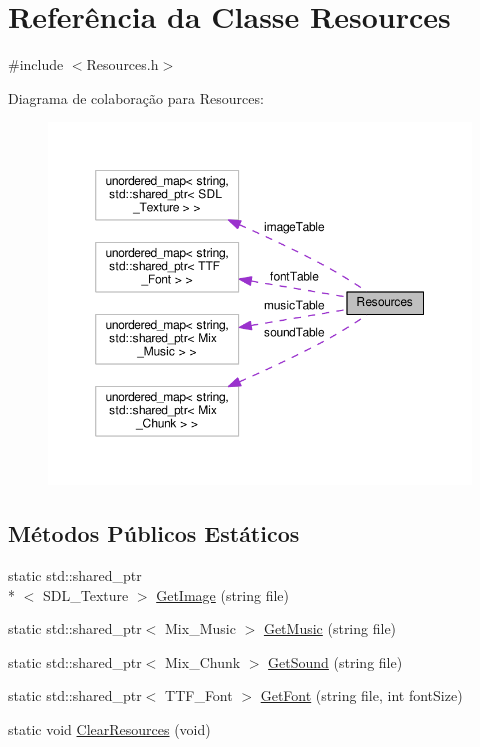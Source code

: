 \hypertarget{classResources}{\section{Referência da Classe Resources}
\label{classResources}
}


{\ttfamily \#include $<$Resources.\+h$>$}



Diagrama de colaboração para Resources\+:
\nopagebreak
\begin{figure}[H]
\begin{center}
\leavevmode
\includegraphics[width=350pt]{classResources__coll__graph}
\end{center}
\end{figure}
\subsection*{Métodos Públicos Estáticos}
\begin{DoxyCompactItemize}
\item 
static std\+::shared\+\_\+ptr\\*
$<$ S\+D\+L\+\_\+\+Texture $>$ \hyperlink{classResources_a557aa346c974a8bce80017dbabd653d9}{Get\+Image} (string file)
\item 
static std\+::shared\+\_\+ptr$<$ Mix\+\_\+\+Music $>$ \hyperlink{classResources_a9ed99125bc4d75514e1175fab6f9badf}{Get\+Music} (string file)
\item 
static std\+::shared\+\_\+ptr$<$ Mix\+\_\+\+Chunk $>$ \hyperlink{classResources_ae6e4e0202dec020da8f6654f685e8b98}{Get\+Sound} (string file)
\item 
static std\+::shared\+\_\+ptr$<$ T\+T\+F\+\_\+\+Font $>$ \hyperlink{classResources_a661a92ea82fb73e31092059d6fc383c3}{Get\+Font} (string file, int font\+Size)
\item 
static void \hyperlink{classResources_a6a704f9988d9189d2d028ab5dcc64496}{Clear\+Resources} (void)
\end{DoxyCompactItemize}

